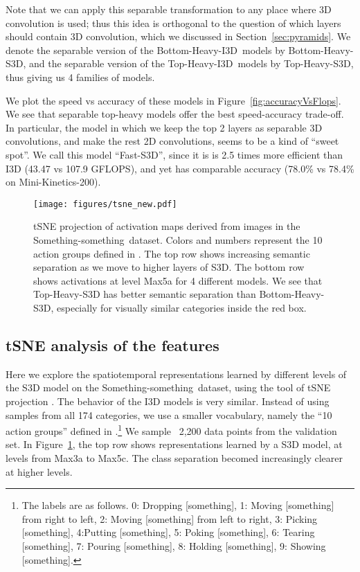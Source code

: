 \documentclass[runningheads]{llncs}
\newcommand{\pyramid}{Bottom-Heavy-I3D}
\newcommand{\invpyramid}{Top-Heavy-I3D}
\newcommand{\spyramid}{Bottom-Heavy-S3D}
\newcommand{\sinvpyramid}{Top-Heavy-S3D}
\newcommand{\MK}{Mini-Kinetics-200}
\newcommand{\Something}{Something-something}
\begin{document}
Note that we can apply this separable transformation to any place where 3D convolution is used;
thus this idea is orthogonal to the question of which layers should contain 3D convolution, which we discussed
in Section~\ref{sec:pyramids}.
We denote 
the separable version of the 
\pyramid\ models by \spyramid,
and the separable version of the 
\invpyramid\ models by \sinvpyramid,
thus 
giving us 4 families of models.

We plot the speed vs accuracy of these models
in Figure~\ref{fig:accuracyVsFlops}. We see that separable top-heavy models offer the best speed-accuracy trade-off.
In particular, the model in which we keep the top 2 layers as separable 3D convolutions,
and make the rest 2D convolutions,
seems to be a kind of ``sweet spot''.
We call this model ``Fast-S3D'',
since it is is 2.5 times more efficient than I3D
(43.47 vs 107.9 GFLOPS), and yet has comparable
accuracy (78.0\% vs 78.4\% on \MK).

\begin{figure}[htp]
\begin{center}
\texttt{[image: figures/tsne\_new.pdf]}
\end{center}
\caption{tSNE projection of activation maps
derived from images in the \Something\ dataset.
Colors and numbers represent the 10 action groups defined in \cite{Something}.
The top row shows increasing semantic separation as we move to higher layers of S3D.
The bottom row shows activations at level Max5a for 4 different models.
We see that Top-Heavy-S3D has better semantic separation 
than Bottom-Heavy-S3D, especially for visually similar categories inside the red box.
}
\label{fig:tSNE}
\end{figure}

\subsection{tSNE analysis of the features}
\label{sec:tSNE}


Here we explore the spatiotemporal representations learned by different levels
of the S3D model 
on the \Something\ dataset,
using the tool of tSNE projection \cite{tSNE}. 
The behavior of the I3D models is very similar.
Instead of using samples from all 174 categories, we use a smaller vocabulary, namely the ``10 action groups'' defined in \cite{Something}.\footnote{
The labels are as follows.
0: Dropping [something], 
1: Moving [something] from right to left, 
2: Moving [something] from left to right, 
3: Picking [something], 
4:Putting [something],
5: Poking [something],
6: Tearing [something],
7: Pouring [something],
8: Holding [something],
9: Showing [something].
} We sample ~2,200 data points from the validation set. 
In Figure~\ref{fig:tSNE}, the top row shows representations learned by a S3D model,  at levels from Max3a to Max5c.
The class separation becomed increasingly clearer at higher levels. 
\end{document}
